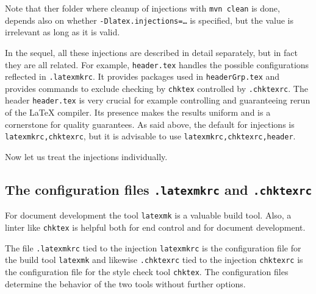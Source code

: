 Note that ther folder where cleanup of injections with \texttt{mvn clean} is done, 
depends also on whether \texttt{-Dlatex.injections=\dots} is specified, 
but the value is irrelevant as long as it is valid. 

In the sequel, all these injections are described in detail separately, 
but in fact they are all related. 
For example, \texttt{header.tex} handles the possible configurations 
reflected in \texttt{.latexmkrc}. 
It provides packages used in \texttt{headerGrp.tex} 
and provides commands to exclude checking by \texttt{chktex} 
controlled by \texttt{.chktexrc}. 
The header \texttt{header.tex} is very crucial 
for example controlling and guaranteeing rerun of the \LaTeX{} compiler. 
Its presence makes the results uniform and is a cornerstone for quality guarantees. 
As said above, the default for injections is \texttt{latexmkrc,chktexrc}, 
but it is advisable to use \texttt{latexmkrc,chktexrc,header}. 





Now let us treat the injections individually. 



\subsection{The configuration files \texttt{.latexmkrc} and \texttt{.chktexrc}}\label{subsec:latChkRc}

For document development the tool \texttt{latexmk} is a valuable build tool. 
Also, a linter like \texttt{chktex} is helpful 
both for end control and for document development. 

The file \texttt{.latexmkrc} tied to the injection \texttt{latexmkrc} 
is the configuration file for the build tool \texttt{latexmk} 
and likewise \texttt{.chktexrc} tied to the injection \texttt{chktexrc} 
is the configuration file for the style check tool \texttt{chktex}. 
The configuration files determine the behavior of the two tools without further options. 

